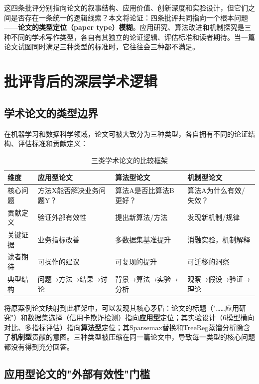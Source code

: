 \documentclass[UTF8,a4paper,12pt,fontset=fandol]{ctexart}
\begin{document}
这四条批评分别指向论文的叙事结构、应用价值、创新深度和实验设计，但它们之间是否存在一条统一的逻辑线索？本文将论证：四条批评共同指向一个根本问题——\textbf{论文的类型定位（paper type）模糊}。应用研究、算法改进和机制探究是三种不同的学术写作类型，各自有其独立的论证逻辑、评估标准和读者期待。当一篇论文试图同时满足三种类型的标准时，它往往会三种都不满足。

\section{批评背后的深层学术逻辑}

\subsection{学术论文的类型边界}

在机器学习和数据科学领域，论文可被大致分为三种类型，各自拥有不同的论证结构、评估标准和贡献定义\cite{wagstaff2012machine}：

\begin{table}[htbp]
\centering
\caption{三类学术论文的比较框架}
\label{tab:paper_types}
\begin{tabular}{p{2.5cm}p{4cm}p{4cm}p{4cm}}
\toprule
\textbf{维度} & \textbf{应用型论文} & \textbf{算法型论文} & \textbf{机制型论文} \\
\midrule
核心问题 & 方法X能否解决业务问题Y？ & 算法A是否比算法B更好？ & 算法A为什么有效/失效？ \\
贡献定义 & 验证外部有效性 & 提出新算法/方法 & 发现新机制/规律 \\
关键证据 & 业务指标改善 & 多数据集基准提升 & 消融实验，机制解释 \\
读者期待 & 可操作的建议 & 可复现的提升 & 可迁移的洞察 \\
典型结构 & 问题→方法→结果→讨论 & 背景→算法→实验→分析 & 观察→假设→验证→理论 \\
\bottomrule
\end{tabular}
\end{table}

将原案例论文映射到此框架中，可以发现其核心矛盾：论文的标题（"……应用研究"）和数据集选择（信用卡欺诈检测）指向\textbf{应用型}定位；其实验设计（6模型横向对比、多指标评估）指向\textbf{算法型}定位；其Sparsemax替换和TreeReg蒸馏分析隐含了\textbf{机制型}贡献的意图。三种类型被压缩在同一篇论文中，导致每一类型的核心问题都没有得到充分回答。

\subsection{应用型论文的"外部有效性"门槛}
\end{document}
